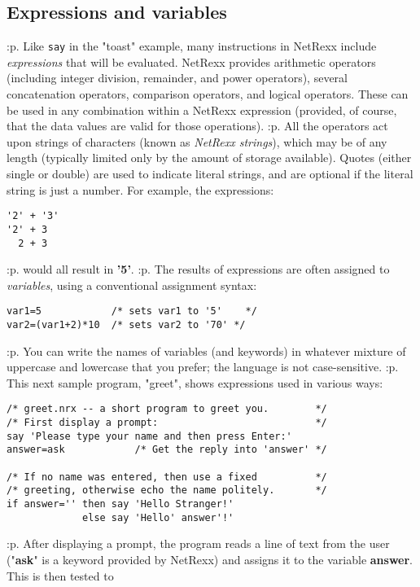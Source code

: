 \subsection{Expressions and variables}\label{refoeprs}
:p.
Like \texttt{say} in the "toast" example, many instructions in NetRexx
include \emph{expressions} that will be evaluated.  NetRexx provides
arithmetic operators (including integer division, remainder, and power
operators), several concatenation operators, comparison operators, and
logical operators.  These can be used in any combination within a
NetRexx expression (provided, of course, that the data values are valid
for those operations).
:p.
All the operators act upon strings of characters (known as \emph{NetRexx
strings}), which may be of any length (typically limited only by the
amount of storage available).  Quotes (either single or double) are used
to indicate literal strings, and are optional if the literal string is
just a number.  For example, the expressions:
\begin{verbatim}
'2' + '3'
'2' + 3
  2 + 3
\end{verbatim}
:p.
would all result in \textbf{'5'}.
:p.
The results of expressions are often assigned to \emph{variables}, using a
conventional assignment syntax:
\begin{verbatim}
var1=5            /* sets var1 to '5'    */
var2=(var1+2)*10  /* sets var2 to '70' */
\end{verbatim}
:p.
You can write the names of variables (and keywords) in whatever mixture
of uppercase and lowercase that you prefer; the language is not
case-sensitive.
:p.
This next sample program, "greet", shows expressions used in
various ways:
\begin{verbatim}
/* greet.nrx -- a short program to greet you.        */
/* First display a prompt:                           */
say 'Please type your name and then press Enter:'
answer=ask            /* Get the reply into 'answer' */

/* If no name was entered, then use a fixed          */
/* greeting, otherwise echo the name politely.       */
if answer='' then say 'Hello Stranger!'
             else say 'Hello' answer'!'
\end{verbatim}
:p.
After displaying a prompt, the program reads a line of text from the
user ("\textbf{ask}" is a keyword provided by NetRexx) and
assigns it to the variable \textbf{answer}.  This is then tested to
